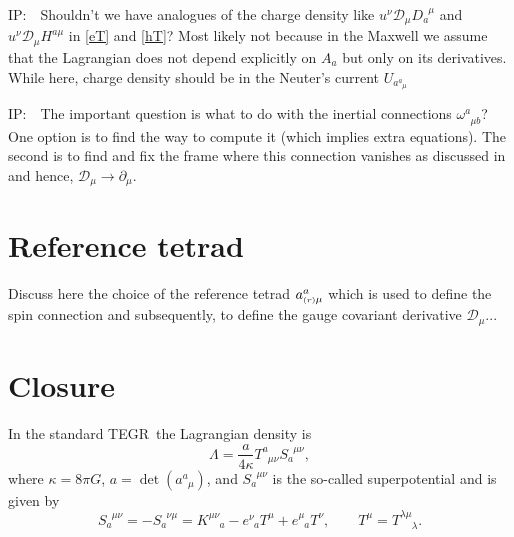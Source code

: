\documentclass[
10pt, %
a4paper, %
oneside, %
headinclude,footinclude, %
BCOR5mm, %
]{scrartcl}
\newcommand{\IP}[1]{{\color{Red}IP:\ \ #1}}
\newcommand{\pd}{\partial}
\newcommand{\itetr}[2]{e^{#1}_{\phantom{#1}#2}}
\newcommand{\tetr}[2]{a^{#1}_{\phantom{#1}#2}}
\newcommand{\rtetr}[2]{a^{#1}_{\mathsmaller{(r)} #2}}
\newcommand{\spin}[2]{\omega^{#1}_{\phantom{#1}#2}}
\newcommand{\D}[1]{\mathcal{D}_{#1}} %
\newcommand{\Tors}[2]{T^{#1}_{\phantom{a}#2}}
\newcommand{\Supp}[2]{S_{#1}^{\phantom{a}#2}}	%
\newcommand{\eT}[2]{D_{#1}^{\phantom{#1}#2}}	%
\newcommand{\hT}[2]{H^{#1#2}}	%
\newcommand{\tegr}{TEGR}
\begin{document}
\IP{Shouldn't we have analogues of the charge density like $ 
u^{\nu}\D{\mu}\eT{a}{\mu} $ and $ u^{\nu}\D{\mu}\hT{a}{\mu} $ in \eqref{eT} 
and \eqref{hT}? Most likely not because in the Maxwell we assume that the 
Lagrangian does not depend explicitly on $ A_a $ but only on its derivatives. 
While here, charge density should be in the Neuter's current $ 
U_{\tetr{a}{\mu}} $ }

\IP{The important question is what to do with the inertial connections $ 
\spin{a}{\mu b} $? One option is to find the way to compute it (which implies 
extra equations). The 
second is to find and fix the frame where this connection vanishes as discussed 
in \cite{Obukhov2019} and hence, $ \D{\mu} \rightarrow \pd_\mu $.}


\section{Reference tetrad}

Discuss here the choice of the reference tetrad $ \rtetr{a}{\mu} $ which is used to define the spin 
connection and 
subsequently, to define the gauge covariant derivative $ \D{\mu} $...


\section{Closure}



In the standard \tegr\ the Lagrangian density is %
\begin{equation}
\Lambda = \frac{a}{4\kappa} \Tors{a}{\mu\nu}\Supp{a}{\mu\nu},
\end{equation}
where $ \kappa = 8 \pi G $, $ a = \det(\tetr{a}{\mu}) $, and $ \Supp{a}{\mu\nu} $ is the so-called 
superpotential and is given by
\begin{equation}
\Supp{a}{\mu\nu} = -\Supp{a}{\nu\mu} = K^{\mu\nu}_{\phantom{\mu\nu}a} - \itetr{\nu}{a} T^\mu + 
\itetr{\mu}{a} 
T^\nu, \qquad T^\mu = T^{\lambda\mu}_{\phantom{\lambda\mu}\lambda}.
\end{equation}



\printbibliography
\end{document}

